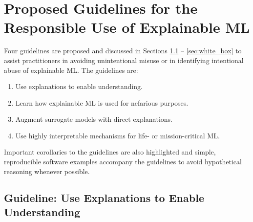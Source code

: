 \documentclass{article}
\begin{document}
\section{Proposed Guidelines for the Responsible Use of Explainable ML}

Four guidelines are proposed and discussed in Sections \ref{sec:trust} -- \ref{sec:white_box} to assist practitioners in avoiding unintentional misuse or in identifying intentional abuse of explainable ML. The guidelines are: 

\begin{enumerate}

\item Use explanations to enable understanding.
\item Learn how explainable ML is used for nefarious purposes.
\item Augment surrogate models with direct explanations.
\item Use highly interpretable mechanisms for life- or mission-critical ML.

\end{enumerate}

\noindent Important corollaries to the guidelines are also highlighted and simple, reproducible software examples accompany the guidelines to avoid hypothetical reasoning whenever possible. 

\subsection{Guideline: Use Explanations to Enable Understanding} \label{sec:trust}
\end{document}
